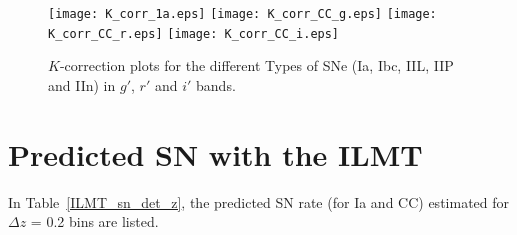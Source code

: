 \documentclass[useAMS,usenatbib]{mnras}
\begin{document}
\begin{figure*}
\centering
\texttt{[image: K\_corr\_1a.eps]}
\texttt{[image: K\_corr\_CC\_g.eps]}
\texttt{[image: K\_corr\_CC\_r.eps]}
\texttt{[image: K\_corr\_CC\_i.eps]}
\caption{$K$-correction plots for the different Types of SNe (Ia, Ibc, IIL, IIP and IIn) in $g'$, $r'$
and $i'$ bands.}
\label{fig_Kcor}
\end{figure*}

\section{Predicted SN with the ILMT}
In Table~\ref{ILMT_sn_det_z}, the predicted SN rate (for Ia and CC) estimated for $\Delta$$z$ = 0.2 bins are listed.
\end{document}
